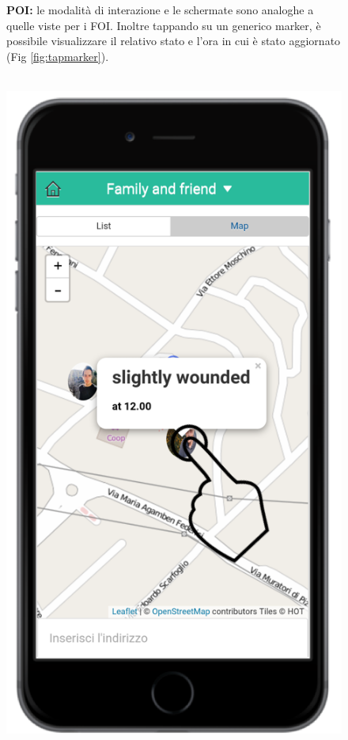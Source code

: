  \begin{figure}
\textbf{ POI:} le modalità di interazione e le schermate sono analoghe a quelle viste per i FOI. Inoltre tappando su un generico marker, è possibile visualizzare il relativo stato e l'ora in cui è stato aggiornato (Fig \ref{fig:tapmarker}). 
 \\ \\
 \begin{minipage}[b]{6cm}
   \centering
	\includegraphics[scale=0.9]{interfaccia/tapmarker.png}

\end{minipage}
\end{figure}
